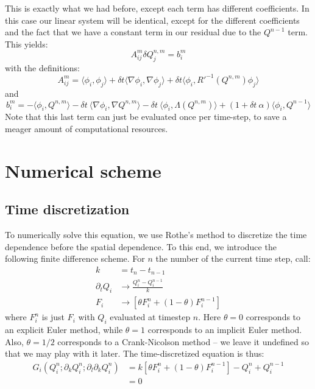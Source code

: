 \documentclass[reqno]{article}
\begin{document}
  This is exactly what we had before, except each term has different
  coefficients.
  In this case our linear system will be identical, except for the different
  coefficients and the fact that we have a constant term in our residual due to
  the $Q^{n - 1}$ term.
  This yields:
  \begin{equation}
    A^m_{ij} \delta Q^{n, m}_j = b^m_i
  \end{equation}
  with the definitions:
  \begin{equation}
    A^m_{ij}
    = \langle \phi_i, \phi_j \rangle
    + \delta t \langle \nabla \phi_i, \nabla \phi_j \rangle
    + \delta t \langle \phi_i, R'^{-1}(Q^{n, m}) \phi_j \rangle
  \end{equation}
  and
  \begin{equation}
    b^m_i
    = -\langle \phi_i, Q^{n, m} \rangle
    - \delta t \: \langle \nabla \phi_i, \nabla Q^{n, m} \rangle
    - \delta t \: \langle \phi_i, \Lambda(Q^{n, m}) \rangle
    + (1 + \delta t \: \alpha) \langle \phi_i, Q^{n - 1} \rangle
  \end{equation}
  Note that this last term can just be evaluated once per time-step, to save a
  meager amount of computational resources.
	
	\section{Numerical scheme}
	\subsection{Time discretization}
	To numerically solve this equation, we use Rothe's method to discretize the time dependence before the spatial dependence.
	To this end, we introduce the following finite difference scheme.
	For $n$ the number of the current time step, call:
	\begin{align}
		k &= t_n - t_{n - 1} \\
		\partial_t Q_i &\to \frac{Q^n_i - Q^{n - 1}_i}{k} \\
		F_i &\to \left[ \theta F_i^n + (1 - \theta) F_i^{n - 1} \right]
	\end{align}
	where $F^n_i$ is just $F_i$ with $Q_i$ evaluated at timestep $n$.
	Here $\theta = 0$ corresponds to an explicit Euler method, while $\theta = 1$ corresponds to an implicit Euler method.
	Also, $\theta = 1/2$ corresponds to a Crank-Nicolson method -- we leave it undefined so that we may play with it later.
	The time-discretized equation is thus:
	\begin{equation}
	\begin{split}
		G_i \left(Q^n_i ; \partial_k Q^n_i ; \partial_l \partial_k Q^n_i\right)
		&= k \left[ \theta F^n_i + (1 - \theta) F^{n - 1}_i \right]
		- Q^n_i + Q^{n - 1}_i \\
		&= 0
	\end{split}
	\end{equation}
	
\end{document}
